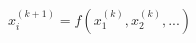 \documentclass[preview]{standalone}
\begin{document}
\begin{align*}
x_i^{(k+1)} = f(x_1^{(k)}, x_2^{(k)}, ...)
\end{align*}
\end{document}
